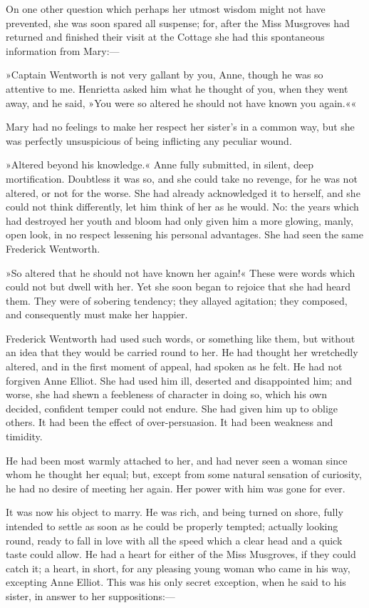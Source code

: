 On one other question which perhaps her utmost wisdom might not have prevented, she was soon spared all suspense; for, after the Miss Musgroves had returned and finished their visit at the Cottage she had this spontaneous information from Mary:—

»Captain Wentworth is not very gallant by you, Anne, though he was so attentive to me. Henrietta asked him what he thought of you, when they went away, and he said, »You were so altered he should not have known you again.««

Mary had no feelings to make her respect her sister's in a common way, but she was perfectly unsuspicious of being inflicting any peculiar wound.

»Altered beyond his knowledge.« Anne fully submitted, in silent, deep mortification. Doubtless it was so, and she could take no revenge, for he was not altered, or not for the worse. She had already acknowledged it to herself, and she could not think differently, let him think of her as he would. No: the years which had destroyed her youth and bloom had only given him a more glowing, manly, open look, in no respect lessening his personal advantages. She had seen the same Frederick Wentworth.

»So altered that he should not have known her again!« These were words which could not but dwell with her. Yet she soon began to rejoice that she had heard them. They were of sobering tendency; they allayed agitation; they composed, and consequently must make her happier.

Frederick Wentworth had used such words, or something like them, but without an idea that they would be carried round to her. He had thought her wretchedly altered, and in the first moment of appeal, had spoken as he felt. He had not forgiven Anne Elliot. She had used him ill, deserted and disappointed him; and worse, she had shewn a feebleness of character in doing so, which his own decided, confident temper could not endure. She had given him up to oblige others. It had been the effect of over-persuasion. It had been weakness and timidity.

He had been most warmly attached to her, and had never seen a woman since whom he thought her equal; but, except from some natural sensation of curiosity, he had no desire of meeting her again. Her power with him was gone for ever.

It was now his object to marry. He was rich, and being turned on shore, fully intended to settle as soon as he could be properly tempted; actually looking round, ready to fall in love with all the speed which a clear head and a quick taste could allow. He had a heart for either of the Miss Musgroves, if they could catch it; a heart, in short, for any pleasing young woman who came in his way, excepting Anne Elliot. This was his only secret exception, when he said to his sister, in answer to her suppositions:—

